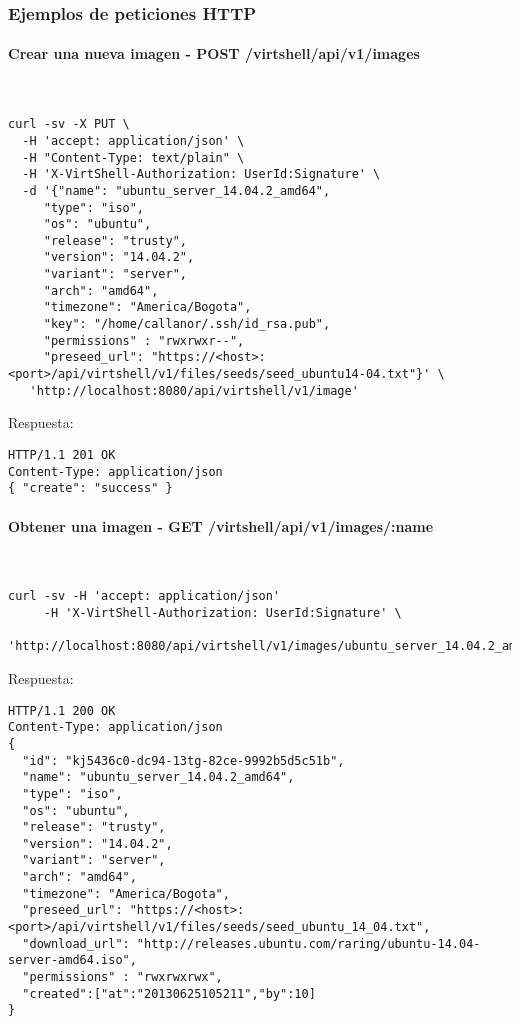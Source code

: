 \subsubsection{Ejemplos de peticiones HTTP}

\paragraph{Crear una nueva imagen - POST /virtshell/api/v1/images} ~\\

\begin{lstlisting}[style=json]
curl -sv -X PUT \
  -H 'accept: application/json' \
  -H "Content-Type: text/plain" \
  -H 'X-VirtShell-Authorization: UserId:Signature' \
  -d '{"name": "ubuntu_server_14.04.2_amd64",
     "type": "iso",
     "os": "ubuntu", 
     "release": "trusty",
     "version": "14.04.2", 
     "variant": "server", 
     "arch": "amd64", 
     "timezone": "America/Bogota", 
     "key": "/home/callanor/.ssh/id_rsa.pub",
     "permissions" : "rwxrwxr--",
     "preseed_url": "https://<host>:<port>/api/virtshell/v1/files/seeds/seed_ubuntu14-04.txt"}' \
   'http://localhost:8080/api/virtshell/v1/image'
\end{lstlisting}

\vspace{1cm}
Respuesta:
\vspace{1cm}

\begin{lstlisting}[style=json]
HTTP/1.1 201 OK
Content-Type: application/json
{ "create": "success" }
\end{lstlisting}

\paragraph{Obtener una imagen - GET /virtshell/api/v1/images/:name} ~\\

\begin{lstlisting}[style=json]
curl -sv -H 'accept: application/json' 
     -H 'X-VirtShell-Authorization: UserId:Signature' \ 
     'http://localhost:8080/api/virtshell/v1/images/ubuntu_server_14.04.2_amd64'
\end{lstlisting}

\vspace{1cm}
Respuesta:
\vspace{1cm}

\begin{lstlisting}[style=json]
HTTP/1.1 200 OK
Content-Type: application/json
{
  "id": "kj5436c0-dc94-13tg-82ce-9992b5d5c51b",
  "name": "ubuntu_server_14.04.2_amd64",
  "type": "iso",
  "os": "ubuntu", 
  "release": "trusty",
  "version": "14.04.2", 
  "variant": "server", 
  "arch": "amd64", 
  "timezone": "America/Bogota", 
  "preseed_url": "https://<host>:<port>/api/virtshell/v1/files/seeds/seed_ubuntu_14_04.txt",
  "download_url": "http://releases.ubuntu.com/raring/ubuntu-14.04-server-amd64.iso",
  "permissions" : "rwxrwxrwx",
  "created":["at":"20130625105211","by":10]
}
\end{lstlisting}

